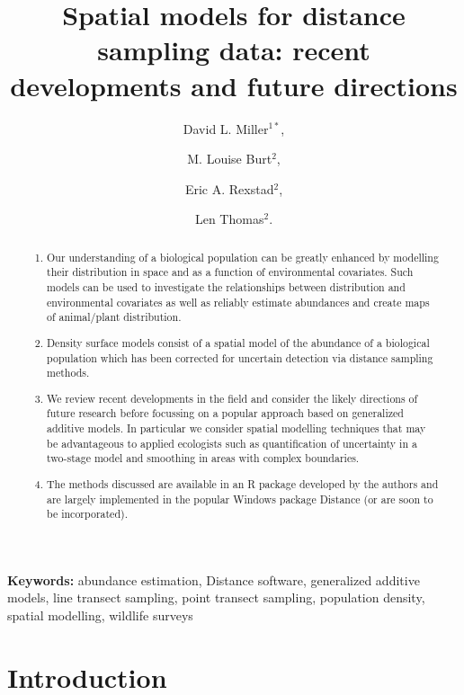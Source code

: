 \documentclass[a4paper,12pt]{article}
\title{Spatial models for distance sampling data: recent developments and future directions}
\author{
David L. Miller$^{1*}$, \and
M. Louise Burt$^{2}$, \and
Eric A. Rexstad$^{2}$, \and 
Len Thomas$^{2}$.}
\begin{document}
\maketitle

\begin{abstract}
  \noindent 

\begin{enumerate}
	\item Our understanding of a biological population can be greatly enhanced by modelling their distribution in space and as a function of environmental covariates. Such models can be used to investigate the relationships between distribution and environmental covariates as well as reliably estimate abundances and create maps of animal/plant distribution. 
	\item Density surface models consist of a spatial model of the abundance of a biological population which has been corrected for uncertain detection via distance sampling methods. 
	\item We review recent developments in the field and consider the likely directions of future research before focussing on a popular approach based on generalized additive models.  In particular we consider spatial modelling techniques that may be advantageous to applied ecologists such as quantification of uncertainty in a two-stage model and smoothing in areas with complex boundaries.
	\item The methods discussed are available in an \textsf{R} package developed by the authors and are largely implemented in the popular Windows package Distance (or are soon to be incorporated).
\end{enumerate}
 

\end{abstract}

\noindent \textbf{Keywords:} abundance estimation, Distance software, generalized additive models, line transect sampling, point transect sampling, population density, spatial modelling, wildlife surveys


\newpage

\section*{Introduction}
\label{s:intro}
\end{document}
